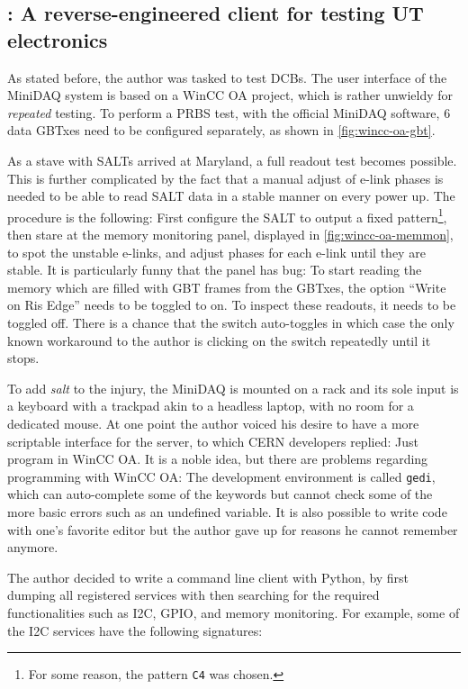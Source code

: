 \subsection{\nanoDAQ: A reverse-engineered \dim client for testing UT electronics}
\label{online-nanodaq}

As stated before, the author was tasked to test DCBs.
The user interface of the MiniDAQ system is based on a WinCC OA project,
which is rather unwieldy for \emph{repeated} testing.
To perform a PRBS test, with the official MiniDAQ software, 6 data GBTxes need
to be configured separately, as shown in \cref{fig:wincc-oa-gbt}.


As a stave with SALTs arrived at Maryland,
a full readout test becomes possible.
This is further complicated by the fact that a manual adjust of e-link phases is
needed to be able to read SALT data in a stable manner on every power up.
The procedure is the following: First configure the SALT to output a
fixed pattern\footnote{
    For some reason, the pattern \lstinline{C4} was chosen.
}, then stare at the memory monitoring panel,
displayed in \cref{fig:wincc-oa-memmon},
to spot the unstable e-links, and adjust phases for each e-link until they are
stable.
It is particularly funny that the panel has bug: To start reading the memory
which are filled with GBT frames from the GBTxes,
the option ``Write on Ris Edge'' needs to be toggled to on.
To inspect these readouts, it needs to be toggled off.
There is a chance that the switch auto-toggles in which case the only known
workaround to the author is clicking on the switch repeatedly until it stops.


To add \emph{salt} to the injury,
the MiniDAQ is mounted on a rack and its sole input is a keyboard with a
trackpad akin to a headless laptop, with no room for a dedicated mouse.
At one point the author voiced his desire to have a more scriptable interface
for the \dim server,
to which CERN developers replied:
Just program in WinCC OA.
It is a noble idea,
but there are problems regarding programming with WinCC OA:
The development environment is called \lstinline{gedi}, which can auto-complete
some of the keywords but cannot check some of the more basic errors such as an
undefined variable.
It is also possible to write code with one's favorite editor but the author
gave up for reasons he cannot remember anymore.

The author decided to write a command line \dim client with Python,
by first dumping all registered \dim services with \pydim
\cite{pydim}
then searching for the required functionalities such as I2C, GPIO, and memory
monitoring.
For example, some of the I2C services have the following signatures:

